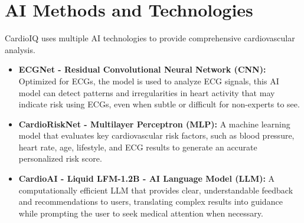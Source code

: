 \documentclass[12pt]{article}
\begin{document}
\begin{center}
\end{center}
\section*{AI Methods and Technologies}

CardioIQ uses multiple AI technologies to provide comprehensive cardiovascular analysis. 

\begin{itemize}[leftmargin=1.5em]
    \item \textbf{ECGNet - Residual Convolutional Neural Network (CNN):} Optimized for ECGs, the model is used to analyze ECG signals, this AI model can detect patterns and irregularities in heart activity that may indicate risk using ECGs, even when subtle or difficult for non-experts to see.
    \item \textbf{CardioRiskNet - Multilayer Perceptron (MLP):} A machine learning model that evaluates key cardiovascular risk factors, such as blood pressure, heart rate, age, lifestyle, and ECG results to generate an accurate personalized risk score.
    \item \textbf{CardioAI - Liquid LFM-1.2B - AI Language Model (LLM):} A computationally efficient LLM that provides clear, understandable feedback and recommendations to users, translating complex results into guidance while prompting the user to seek medical attention when necessary.
\end{itemize}
\end{document}
